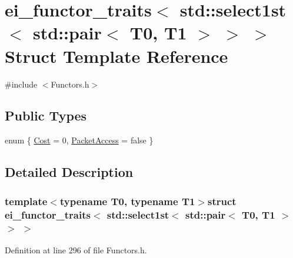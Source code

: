 \hypertarget{structei__functor__traits_3_01std_1_1select1st_3_01std_1_1pair_3_01_t0_00_01_t1_01_4_01_4_01_4}{\section{ei\-\_\-functor\-\_\-traits$<$ std\-:\-:select1st$<$ std\-:\-:pair$<$ T0, T1 $>$ $>$ $>$ Struct Template Reference}
\label{structei__functor__traits_3_01std_1_1select1st_3_01std_1_1pair_3_01_t0_00_01_t1_01_4_01_4_01_4}
}


{\ttfamily \#include $<$Functors.\-h$>$}

\subsection*{Public Types}
\begin{DoxyCompactItemize}
\item 
enum \{ \hyperlink{structei__functor__traits_3_01std_1_1select1st_3_01std_1_1pair_3_01_t0_00_01_t1_01_4_01_4_01_4_a4d3b391af1b4011953b059e4a0df7633a74c9ae24bd3b07caae93891d10d81a2c}{Cost} = 0, 
\hyperlink{structei__functor__traits_3_01std_1_1select1st_3_01std_1_1pair_3_01_t0_00_01_t1_01_4_01_4_01_4_a4d3b391af1b4011953b059e4a0df7633a13930bd4dae02919764af1432d6ac7d6}{Packet\-Access} = false
 \}
\end{DoxyCompactItemize}


\subsection{Detailed Description}
\subsubsection*{template$<$typename T0, typename T1$>$struct ei\-\_\-functor\-\_\-traits$<$ std\-::select1st$<$ std\-::pair$<$ T0, T1 $>$ $>$ $>$}



Definition at line 296 of file Functors.\-h.



